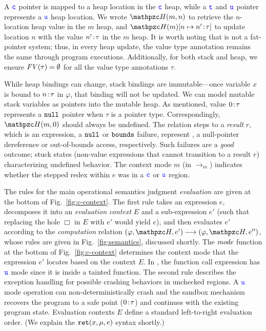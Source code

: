 A $\textcolor{blue}{\texttt{c}}$ pointer is mapped to a heap location in the $\textcolor{blue}{\texttt{c}}$ heap, 
while a $\textcolor{blue}{\texttt{t}}$ and $\textcolor{blue}{\texttt{u}}$ pointer represents a $\textcolor{blue}{\texttt{u}}$ heap location.
We wrote $\heap(m,n)$ to retrieve the $n$-location heap value in the $m$ heap,
and $\heapup{m}{n}{\evalue{n'}{\tau}}$ 
to update location $n$ with the value ${n'}\!:\!{\tau}$ in the $m$ heap.
It is worth noting that \systemname is not a fat-pointer system;
thus, in every heap update, the value type annotation remains the same through program executions.
% 
% 
Additionally, for both stack and heap, 
we ensure $\mathit{FV}(\tau)=\emptyset$ for all the value type annotations $\tau$.

While heap bindings can change, stack bindings are immutable---once
variable $x$ is bound to ${n}\!:\!{\tau}$ in $\varphi$, that binding will not
be updated. 
We can model mutable stack variables as pointers into the
mutable heap.
As mentioned, value ${0}\!:\!{\tau}$
represents a $\mathtt{null}$ pointer when $\tau$ is a pointer type.
Correspondingly, $\heap(m,0)$ should always be undefined.
% 
The relation steps to a \emph{result} $r$, which is   an
expression, a $\mathtt{null}$ or $\mathtt{bounds}$ failure, represent , a null-pointer dereference or out-of-bounds access,
respectively.
% 
Such failures are a \emph{good} outcome; stuck states
(non-value expressions that cannot transition to a result $r$)
characterizing undefined behavior.
%
% 
The context mode $m$ (in $\longrightarrow_{m}$) indicates whether the
stepped redex within $e$ was in a $\textcolor{blue}{\texttt{c}}$ or $\textcolor{blue}{\texttt{u}}$ region.

The rules for the main operational semantics
judgment \emph{evaluation} are given at the bottom of
Fig.~\ref{fig:c-context}.
The first rule takes an expression $e$, decomposes
it into an \emph{evaluation context} $E$ and a sub-expression $e'$
(such that replacing the hole $\Box$ in $E$ with $e'$ would yield
$e$), and then evaluates $e'$ according to the \emph{computation}
  relation $(\varphi,\heap,e') \longrightarrow (\varphi,\heap,e'')$,
whose rules are given in Fig.~\ref{fig:semantics}, discussed
shortly.
The $\textit{mode}$ function  at the bottom of Fig.~\ref{fig:c-context}
determines the context mode that the expression $e'$ locates based on the context $E$.
In , the function call expression  has $\textcolor{blue}{\texttt{u}}$ mode since it is inside a tainted function.
The second rule describes the exception handling 
for possible crashing behaviors in unchecked regions.
A $\textcolor{blue}{\texttt{u}}$ mode operation can non-deterministically crash
and the \systemname sandbox mechanism recovers
the program to a safe point (${0}\!:\!{\tau}$)
and continues with the existing program state.
Evaluation contexts $E$ define a standard left-to-right evaluation order. (We explain the
$\mathtt{ret}({x},{\mu},{e})$ syntax shortly.)


